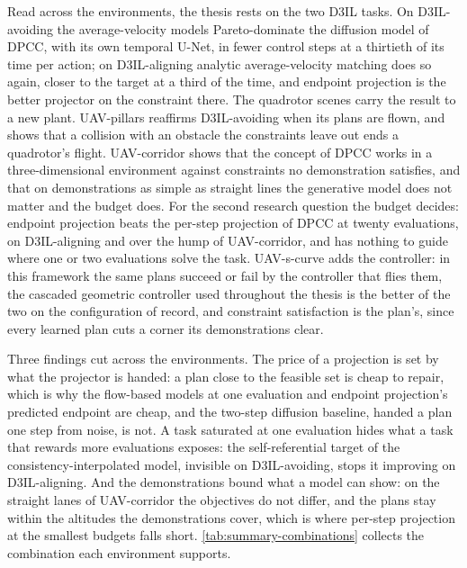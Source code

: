 Read across the environments, the thesis rests on the two D3IL tasks. On D3IL-avoiding the average-velocity
models Pareto-dominate the diffusion model of \ac{DPCC}, with its own temporal U-Net, in fewer control steps
at a thirtieth of its time per action; on D3IL-aligning analytic average-velocity matching does so again,
closer to the target at a third of the time, and endpoint projection is the better projector on the
constraint there. The
quadrotor scenes carry the result to a new plant. UAV-pillars reaffirms D3IL-avoiding when its plans are
flown, and shows that a collision with an obstacle the constraints leave out ends a quadrotor's flight.
UAV-corridor shows that the concept of \ac{DPCC} works in a three-dimensional environment against constraints
no demonstration satisfies, and that on demonstrations as simple as straight lines the generative model does
not matter and the budget does. For the second research question the budget decides: endpoint projection
beats the per-step projection of \ac{DPCC} at twenty evaluations, on D3IL-aligning and over the hump of
UAV-corridor, and has nothing to guide where one or two evaluations solve the task. UAV-s-curve adds the controller: in
this framework the same plans succeed or fail by the controller that flies them, the cascaded geometric
controller used throughout the thesis is the better of the two on the configuration of record, and constraint
satisfaction is the plan's, since every learned plan cuts a corner its demonstrations clear.

Three findings cut across the environments. The price of a projection is set by what the projector is
handed: a plan close to the feasible set is cheap to repair, which is why the flow-based models at one
evaluation and endpoint projection's predicted endpoint are cheap, and the two-step diffusion baseline,
handed a plan one step from noise, is not. A task saturated at one evaluation hides what a task that rewards
more evaluations exposes: the self-referential target of the consistency-interpolated model, invisible on
D3IL-avoiding, stops it improving on D3IL-aligning. And the demonstrations bound what a model can show: on
the straight lanes of UAV-corridor the objectives do not differ, and the plans stay within the altitudes the
demonstrations cover, which is where per-step projection at the smallest budgets falls short.
\autoref{tab:summary-combinations} collects the combination each environment supports.

